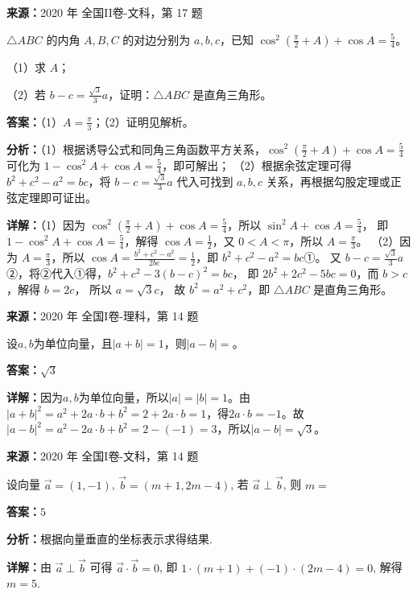 \begin{question}[points=12]
\textbf{来源：}2020 年 全国II卷-文科，第 17 题\par
$\triangle ABC$ 的内角 $A,B,C$ 的对边分别为 $a,b,c$，已知 $\cos^2\left(\frac{\pi}{2}+A\right)+\cos A=\frac{5}{4}$。

（1）求 $A$；

（2）若 $b-c=\frac{\sqrt{3}}{3}a$，证明：$\triangle ABC$ 是直角三角形。
\begin{solution}
\textbf{答案：}（1）$A=\frac{\pi}{3}$；（2）证明见解析。

\textbf{分析：}（1）根据诱导公式和同角三角函数平方关系，$\cos^2\left(\frac{\pi}{2}+A\right)+\cos A=\frac{5}{4}$ 可化为 $1-\cos^2 A+\cos A=\frac{5}{4}$，即可解出；
（2）根据余弦定理可得 $b^2+c^2-a^2=bc$，将 $b-c=\frac{\sqrt{3}}{3}a$ 代入可找到 $a,b,c$ 关系，再根据勾股定理或正弦定理即可证出。

\textbf{详解：}（1）因为 $\cos^2\left(\frac{\pi}{2}+A\right)+\cos A=\frac{5}{4}$，所以 $\sin^2 A+\cos A=\frac{5}{4}$，
即 $1-\cos^2 A+\cos A=\frac{5}{4}$，解得 $\cos A=\frac{1}{2}$，又 $0<A<\pi$，所以 $A=\frac{\pi}{3}$。
（2）因为 $A=\frac{\pi}{3}$，所以 $\cos A=\frac{b^2+c^2-a^2}{2bc}=\frac{1}{2}$，即 $b^2+c^2-a^2=bc$①。
又 $b-c=\frac{\sqrt{3}}{3}a$②，将②代入①得，$b^2+c^2-3(b-c)^2=bc$，
即 $2b^2+2c^2-5bc=0$，而 $b>c$，解得 $b=2c$，
所以 $a=\sqrt{3}c$，
故 $b^2=a^2+c^2$，即 $\triangle ABC$ 是直角三角形。
\end{solution}
\end{question}

\begin{question}[points=5]
\textbf{来源：}2020 年 全国I卷-理科，第 14 题\par
设$a,b$为单位向量，且$|a+b|=1$，则$|a-b|=$。
\fillin[{$\sqrt{3}$}]
\begin{solution}
\textbf{答案：}$\sqrt{3}$

\textbf{详解：}因为$a,b$为单位向量，所以$|a|=|b|=1$。由$|a+b|^2=a^2+2a\cdot b+b^2=2+2a\cdot b=1$，得$2a\cdot b=-1$。故$|a-b|^2=a^2-2a\cdot b+b^2=2-(-1)=3$，所以$|a-b|=\sqrt{3}$。
\end{solution}
\end{question}

\begin{question}[points=5]
\textbf{来源：}2020 年 全国I卷-文科，第 14 题\par
设向量 $\vec{a} = (1, -1)$, $\vec{b} = (m+1, 2m-4)$, 若 $\vec{a} \perp \vec{b}$, 则 $m =$
\fillin[{$5$}]
\begin{solution}
\textbf{答案：}$5$

\textbf{分析：}根据向量垂直的坐标表示求得结果.

\textbf{详解：}由 $\vec{a} \perp \vec{b}$ 可得 $\vec{a} \cdot \vec{b} = 0$, 即 $1\cdot(m+1) + (-1)\cdot(2m-4) = 0$, 解得 $m=5$.
\end{solution}
\end{question}

